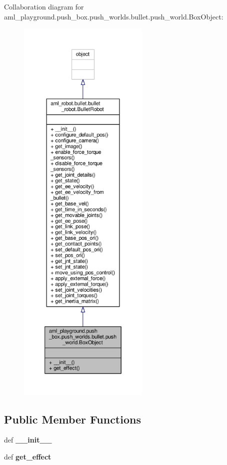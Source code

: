 Collaboration diagram for aml\-\_\-playground.\-push\-\_\-box.\-push\-\_\-worlds.\-bullet.\-push\-\_\-world.\-Box\-Object\-:
\nopagebreak
\begin{figure}[H]
\begin{center}
\leavevmode
\includegraphics[height=550pt]{classaml__playground_1_1push__box_1_1push__worlds_1_1bullet_1_1push__world_1_1_box_object__coll__graph}
\end{center}
\end{figure}
\subsection*{Public Member Functions}
\begin{DoxyCompactItemize}
\item 
\hypertarget{classaml__playground_1_1push__box_1_1push__worlds_1_1bullet_1_1push__world_1_1_box_object_a40e3b09707ed36e2d97f5a28da68b39c}{def {\bfseries \-\_\-\-\_\-init\-\_\-\-\_\-}}\label{classaml__playground_1_1push__box_1_1push__worlds_1_1bullet_1_1push__world_1_1_box_object_a40e3b09707ed36e2d97f5a28da68b39c}

\item 
\hypertarget{classaml__playground_1_1push__box_1_1push__worlds_1_1bullet_1_1push__world_1_1_box_object_a9f10a558dc0bdcc193b2f1c9ae8e6808}{def {\bfseries get\-\_\-effect}}\label{classaml__playground_1_1push__box_1_1push__worlds_1_1bullet_1_1push__world_1_1_box_object_a9f10a558dc0bdcc193b2f1c9ae8e6808}

\end{DoxyCompactItemize}



